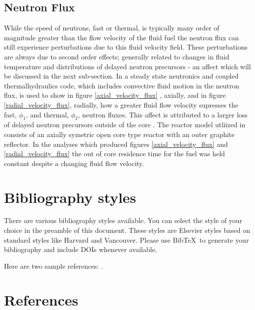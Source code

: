 \documentclass[review]{elsarticle}
\begin{document}
\subsection{Neutron Flux} 
While the speed of neutrons, fast or thermal, is typically many order of magnitude greater than
the flow velocity of the fluid fuel the neutron flux can still experience
perturbations due to this fluid velocity field. These perturbations are always
due to second order effects; generally related to changes in fluid temperature
and distributions of delayed neutron precursors - an affect which will be
discussed in the next sub-section. In \cite{zhang_development_2009-1} a steady
state neutronics and coupled thermalhydraulics code, which includes convective
fluid motion in the neutron flux, is used to show in figure 
\ref{axial_velocity_flux}
, axially, and in figure \ref{radial_velocity_flux}, radially, how a greater fluid flow
 velocity supresses the fast, $\phi_{1}$, and thermal, $\phi_{2}$, neutron fluxes. This affect is
 attributed to a larger loss of delayed neutron precursors outside of the core \cite{zhang_development_2009-1}.
  The reactor model
 utliized in \cite{zhang_development_2009-1} consists of an axially symetric
 open core type reactor with an outer graphite reflector. In the analyses which
 produced figures \ref{axial_velocity_flux} and \ref{radial_velocity_flux} the
 out of core residence time for the fuel was held constant despite a changing
 fluid flow velocity.



\section{Bibliography styles}

There are various bibliography styles available. You can select the style of your choice in the preamble of this document. These styles are Elsevier styles based on standard styles like Harvard and Vancouver. Please use Bib\TeX\ to generate your bibliography and include DOIs whenever available.

Here are two sample references: \cite{Feynman1963118,Dirac1953888}.

\section*{References}


\end{document}
